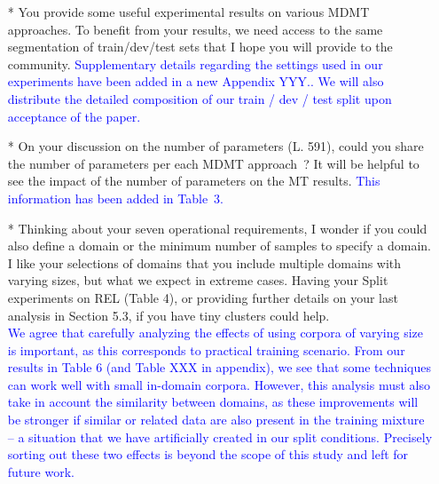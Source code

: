 \documentclass[12pt,times,a4paper,twoside]{article}
\newcommand{\fyTodo}[1]{\Todo[FY:]{\textcolor{orange}{#1}}}
\theoremstyle{definition}
\begin{document}
\begin{itemize}
\item[*] You provide some useful experimental results on various MDMT approaches. To benefit from your results, we need access to the same segmentation of train/dev/test sets that I hope you will provide to the community.
\textcolor{blue}{Supplementary details regarding the settings used in our experiments have been added in a new Appendix YYY.\fyTodo{Fix the appendix.}. We will also distribute the detailed composition of our train / dev / test split upon acceptance of the paper.}
\\
\item[*] On your discussion on the number of parameters (L. 591), could you share the number of parameters per each MDMT approach~? It will be helpful to see  the impact of the number of parameters on the MT results.
  \textcolor{blue}{This information has been added in Table~3\fyTodo{Check number, page and line number and content}.}
\\ 
\item[*] Thinking about your seven operational requirements, I wonder if you could also define a domain or the minimum number of samples to specify a domain. I like your selections of domains that you include multiple domains with varying sizes, but what we expect in extreme cases. Having your Split experiments on REL (Table 4), or providing further details on your last analysis in Section 5.3, if you have tiny clusters could help.\fyTodo{Answer this with more experiments ?}
  \\
  \textcolor{blue}{We agree that carefully analyzing the effects of using corpora of varying size is important, as this corresponds to practical training scenario. From our results in Table 6 (and Table XXX in appendix), we see that some techniques can work well with small in-domain corpora. However, this analysis must also take in account the similarity between domains, as these improvements will be stronger if similar or related data are also present in the training mixture -- a situation that we have artificially created in our split conditions. Precisely sorting out these two effects is beyond the scope of this study and left for future work.}
  

\end{itemize}
\end{document}
